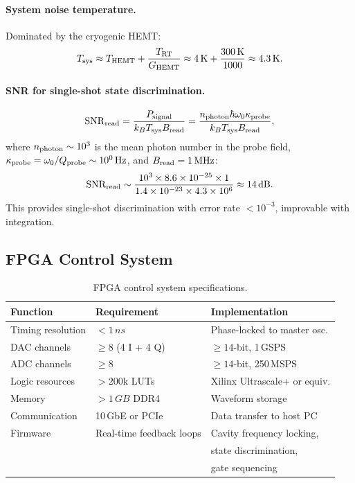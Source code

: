 \documentclass[12pt,a4paper]{article}
\begin{document}
\paragraph{System noise temperature.} Dominated by the cryogenic HEMT:
\begin{equation}
T_{\rm sys} \approx T_{\rm HEMT} + \frac{T_{\rm RT}}{G_{\rm HEMT}} \approx 4\,\si{K} + \frac{300\,\si{K}}{1000} \approx 4.3\,\si{K}.
\end{equation}

\paragraph{SNR for single-shot state discrimination.}
\begin{equation}
\mathrm{SNR}_{\rm read} = \frac{P_{\rm signal}}{k_B T_{\rm sys} B_{\rm read}} = \frac{n_{\rm photon} \hbar\omega_0 \kappa_{\rm probe}}{k_B T_{\rm sys} B_{\rm read}},
\end{equation}
where $n_{\rm photon} \sim 10^3$ is the mean photon number in the probe field, $\kappa_{\rm probe} = \omega_0/Q_{\rm probe} \sim 10^0\,\si{Hz}$, and $B_{\rm read} = 1\,\si{MHz}$:
\begin{equation}
\mathrm{SNR}_{\rm read} \sim \frac{10^3 \times 8.6 \times 10^{-25} \times 1}{1.4 \times 10^{-23} \times 4.3 \times 10^6} \approx 14\,\si{dB}.
\end{equation}
This provides single-shot discrimination with error rate $< 10^{-3}$, improvable with integration.

\subsection{FPGA Control System}

\begin{table}[H]
\centering
\caption{FPGA control system specifications.}
\begin{tabular}{lll}
\toprule
\textbf{Function} & \textbf{Requirement} & \textbf{Implementation} \\
\midrule
Timing resolution & $< 1\,\si{ns}$ & Phase-locked to master osc. \\
DAC channels & $\geq 8$ (4 I + 4 Q) & $\geq 14$-bit, 1\,GSPS \\
ADC channels & $\geq 8$ & $\geq 14$-bit, 250\,MSPS \\
Logic resources & $> 200$k LUTs & Xilinx Ultrascale+ or equiv. \\
Memory & $> 1\,\si{GB}$ DDR4 & Waveform storage \\
Communication & 10\,GbE or PCIe & Data transfer to host PC \\
Firmware & Real-time feedback loops & Cavity frequency locking, \\
 & & state discrimination, \\
 & & gate sequencing \\
\bottomrule
\end{tabular}
\end{table}
\end{document}
